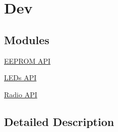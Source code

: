 \hypertarget{group__dev}{}\section{Dev}
\label{group__dev}
\subsection*{Modules}
\begin{DoxyCompactItemize}
\item 
\hyperlink{group__eeprom}{E\+E\+P\+R\+O\+M A\+P\+I}
\item 
\hyperlink{group__leds}{L\+E\+Ds A\+P\+I}
\item 
\hyperlink{group__radio}{Radio A\+P\+I}
\end{DoxyCompactItemize}


\subsection{Detailed Description}
